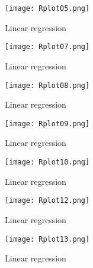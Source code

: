 \documentclass[12pt,fleqn]{report}
\begin{document}
\begin{figure}[h]
  \texttt{[image: Rplot05.png]}
  \caption{Linear regression}
  \label{fig:label_figure}
\end{figure}

\begin{figure}[h]
  \texttt{[image: Rplot07.png]}
  \caption{Linear regression}
  \label{fig:label_figure}
\end{figure}

\begin{figure}[h]
  \texttt{[image: Rplot08.png]}
  \caption{Linear regression}
  \label{fig:label_figure}
\end{figure}

\begin{figure}[h]
  \texttt{[image: Rplot09.png]}
  \caption{Linear regression}
  \label{fig:label_figure}
\end{figure}

\begin{figure}[h]
  \texttt{[image: Rplot10.png]}
  \caption{Linear regression}
  \label{fig:label_figure}
\end{figure}

\begin{figure}[h]
  \texttt{[image: Rplot12.png]}
  \caption{Linear regression}
  \label{fig:label_figure}
\end{figure}

\begin{figure}[h]
  \texttt{[image: Rplot13.png]}
  \caption{Linear regression}
  \label{fig:label_figure}
\end{figure}
\end{document}
